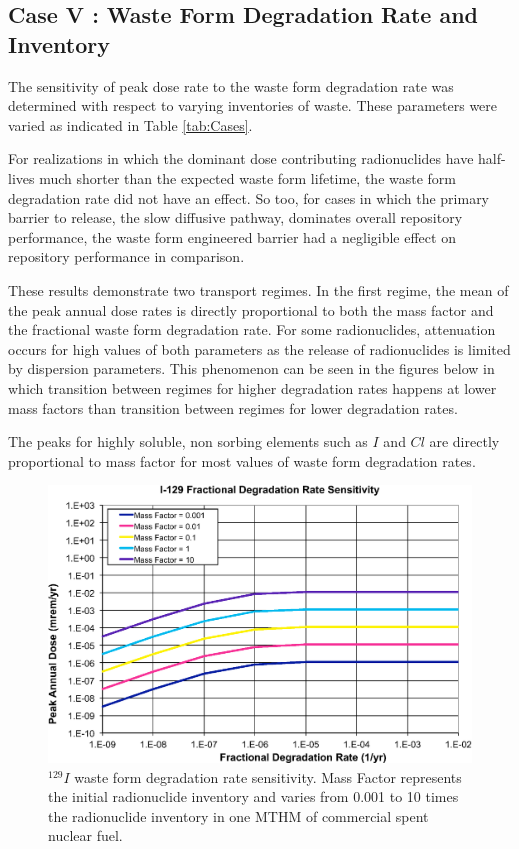 
\subsection{Case V : Waste Form Degradation Rate and Inventory}

The sensitivity of peak dose rate to the waste form degradation rate was 
determined with respect to varying inventories of waste. These parameters were 
varied as indicated in Table \ref{tab:Cases}.

For realizations in which the dominant dose contributing 
radionuclides have half-lives much shorter than the expected waste form lifetime, 
the waste form degradation rate did not have an effect. So too, for 
cases in which the primary barrier to release, the slow diffusive pathway, 
dominates overall repository performance, the waste form engineered barrier
had a negligible effect on repository performance in comparison.

These results demonstrate two transport regimes. In the first regime, the mean 
of the peak annual dose rates is directly proportional to both the mass factor 
and the fractional waste form degradation rate. For some radionuclides, 
attenuation occurs for high values of both parameters as the release of 
radionuclides is limited by dispersion parameters. This phenomenon can be seen 
in the figures below in which transition between regimes for higher degradation 
rates happens at lower mass factors than transition between regimes for lower 
degradation rates. 

The peaks for highly soluble, non sorbing elements such as $I$ and $Cl$
are directly proportional to mass factor for most 
values of waste form degradation rates. 

\begin{figure}[H]
  \centering
  \includegraphics[width=\linewidth]{I129_deg_rate.eps}
  \caption{$^{129}I$ waste form degradation rate sensitivity. Mass Factor 
represents the initial radionuclide inventory and varies from 0.001 to 10 times 
the radionuclide inventory in one \gls{MTHM} of commercial spent nuclear fuel.}
  \label{fig:WFDegI129}
\end{figure}

